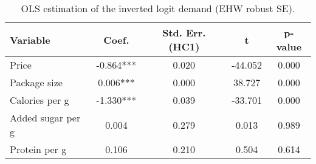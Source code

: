 \begin{table}[H]
\centering
\begin{tabular}{lcccc}
\toprule
Variable & Coef. & Std. Err. (HC1) & t & p-value \\
\midrule
Price & -0.864*** & 0.020 & -44.052 & 0.000 \\
Package size & 0.006*** & 0.000 & 38.727 & 0.000 \\
Calories per g & -1.330*** & 0.039 & -33.701 & 0.000 \\
Added sugar per g & 0.004 & 0.279 & 0.013 & 0.989 \\
Protein per g & 0.106 & 0.210 & 0.504 & 0.614 \\
\bottomrule
\end{tabular}
\caption{OLS estimation of the inverted logit demand (EHW robust SE).}
\label{tab:q3_ols_ehw}
\end{table}
